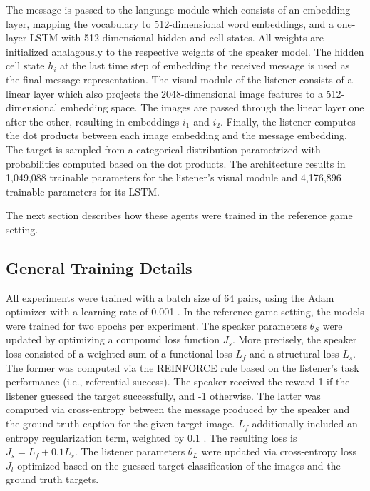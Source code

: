 The message is passed to the language module which consists of an embedding layer, mapping the vocabulary to 512-dimensional word embeddings, and a one-layer LSTM with 512-dimensional hidden and cell states. All weights are initialized analagously to the respective weights of the speaker model. The hidden cell state $h_i$ at the last time step of embedding the received message is used as the final message representation. 
The visual module of the listener consists of a linear layer which also projects the 2048-dimensional image features to a 512-dimensional embedding space. The images are passed through the linear layer one after the other, resulting in embeddings $i_1$ and $i_2$.  Finally, the listener computes the dot products between each image embedding and the message embedding. The target is sampled from a categorical distribution parametrized with probabilities computed based on the dot products.  
The architecture results in 1,049,088 trainable parameters for the listener's visual module and 4,176,896 trainable parameters for its LSTM.

The next section describes how these agents were trained in the reference game setting.


\subsection{General Training Details}

All experiments were trained with a batch size of 64 pairs, using the Adam optimizer with a learning rate  of 0.001 \parencite{kingma2014adam}. In the reference game setting, the models were trained for two epochs per experiment. 
The speaker parameters $\theta_S$ were updated by optimizing a compound loss function $J_s$. More precisely, the speaker loss consisted of a weighted sum of a functional loss $L_f$ and a structural loss $L_s$. The former was computed via the REINFORCE rule based on the listener's task performance (i.e., referential success). The speaker received the reward 1 if the listener guessed the target successfully, and -1 otherwise. The latter was computed via cross-entropy between the message produced by the speaker and the ground truth caption for the given target image. $L_f$ additionally included an entropy regularization term, weighted by 0.1 . The resulting loss is $J_s = L_f + 0.1 L_s$. 
The listener parameters $\theta_L$ were updated via cross-entropy loss $J_l$ optimized based on the guessed target classification of the images and the ground truth targets. 

